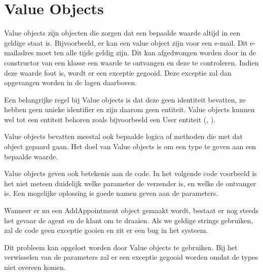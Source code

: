 
\section{Value Objects}
\label{sec:value-objects}

Value objects zijn objecten die zorgen dat een bepaalde waarde altijd in een geldige staat is. Bijvoorbeeld, er kan een value object zijn voor een e-mail. Dit e-mailadres moet ten alle tijde geldig zijn. Dit kan afgedwongen worden door in de constructor van een klasse een waarde te ontvangen en deze te controleren. Indien deze waarde fout is, wordt er een exceptie gegooid. Deze exceptie zal dan opgevangen worden in de lagen daarboven.

Een belangrijke regel bij Value objects is dat deze geen identiteit bevatten, ze hebben geen unieke identifier en zijn daarom geen entiteit. Value objects kunnen wel tot een entiteit behoren zoals bijvoorbeeld een User entiteit (\textcite{Verraes2015ValueObjects}, \textcite{Claes2013Identity}).

Value objects bevatten meestal ook bepaalde logica of methoden die met dat object gepaard gaan. Het doel van Value objects is om een type te geven aan een bepaalde waarde.

Value objects geven ook betekenis aan de code. In het volgende code voorbeeld is het niet meteen duidelijk welke parameter de verzender is, en welke de ontvanger is. Een mogelijke oplossing is goede namen geven aan de parameters.


Wanneer er nu een AddAppointment object gemaakt wordt, bestaat er nog steeds het gevaar de agent en de klant om te draaien. Als we geldige strings gebruiken, zal de code geen exceptie gooien en zit er een bug in het systeem.

Dit probleem kan opgelost worden door Value objects te gebruiken. Bij het verwisselen van de parameters zal er een exceptie gegooid worden omdat de types niet overeen komen.

